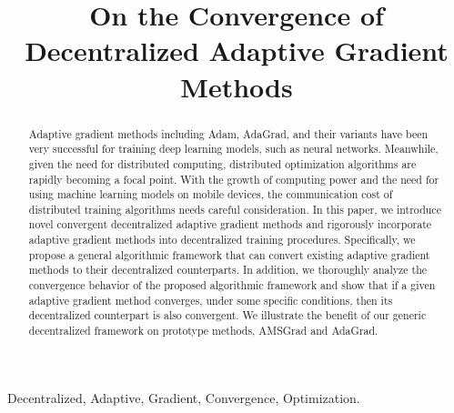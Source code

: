 \documentclass[anon,12pt]{colt2021} %
\title[Decentralized Adaptive Gradient Methods]{On the Convergence of Decentralized Adaptive Gradient Methods}
\begin{document}
\maketitle

\begin{abstract}
Adaptive gradient methods including Adam, AdaGrad, and their variants have been very successful for training deep learning models, such as neural networks. 
Meanwhile, given the need for distributed computing, distributed optimization algorithms are rapidly becoming a focal point.
With the growth of computing power and the need for using machine learning models on mobile devices, the communication cost of distributed training algorithms needs careful consideration. 
In this paper, we introduce novel convergent decentralized adaptive gradient methods and rigorously incorporate adaptive gradient methods into decentralized training procedures. 
Specifically, we propose a general algorithmic framework that can convert existing adaptive gradient methods to their decentralized counterparts. 
In addition, we thoroughly analyze the convergence behavior of the proposed algorithmic framework and show that if a given adaptive gradient method converges, under some specific conditions, then its decentralized counterpart is also convergent. 
We illustrate the benefit of our generic decentralized framework on prototype methods, AMSGrad and AdaGrad.\\
\end{abstract}

\begin{keywords}%
Decentralized, Adaptive, Gradient, Convergence, Optimization.
\end{keywords}
\end{document}
